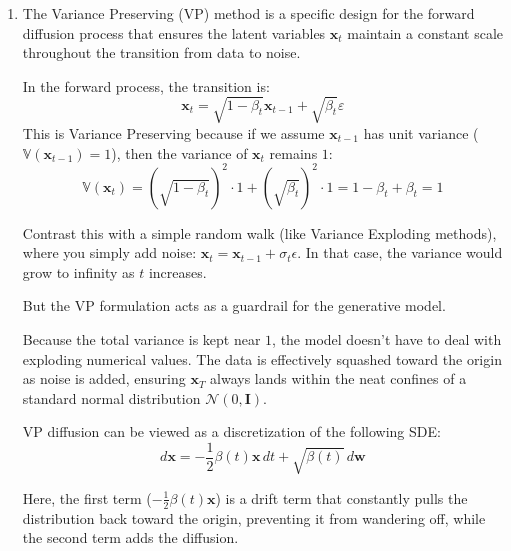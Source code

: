 \documentclass[12pt, xcolor=dvipsnames,svgnames,x11names]{article}
\begin{document}
\begin{enumerate}
\item 

The Variance Preserving (VP) method is a specific design for the forward diffusion process that ensures the latent variables $\mathbf{x}_t$ maintain a constant scale throughout the transition from data to noise. 

In the forward process, the transition is:$$\mathbf{x}_t = \sqrt{1 - \beta_t}\mathbf{x}_{t-1} + \sqrt{\beta_t}\varepsilon$$This is Variance Preserving because if we assume $\mathbf{x}_{t-1}$ has unit variance ($\mathbb{V}(\mathbf{x}_{t-1}) = 1$), then the variance of $\mathbf{x}_t$ remains $1$:$$\mathbb{V}(\mathbf{x}_t) = (\sqrt{1 - \beta_t})^2 \cdot 1 + (\sqrt{\beta_t})^2 \cdot 1 = 1 - \beta_t + \beta_t = 1$$

Contrast this with a simple random walk (like Variance Exploding methods), where you simply add noise: $\mathbf{x}_t = \mathbf{x}_{t-1} + \sigma_t\epsilon$. In that case, the variance would grow to infinity as $t$ increases.

But the VP formulation acts as a guardrail for the generative model.

Because the total variance is kept near $1$, the model doesn't have to deal with exploding numerical values. The data is effectively squashed toward the origin as noise is added, ensuring $\mathbf{x}_T$ always lands within the neat confines of a standard normal distribution $\mathcal{N}(0, \mathbf{I})$.

VP diffusion can be viewed as a discretization of the following SDE:$$d\mathbf{x} = -\frac{1}{2}\beta(t)\mathbf{x} \, dt + \sqrt{\beta(t)} \, d\mathbf{w}$$

Here, the first term ($-\frac{1}{2}\beta(t)\mathbf{x}$) is a drift term that constantly pulls the distribution back toward the origin, preventing it from wandering off, while the second term adds the diffusion.

\end{enumerate}
\end{document}
